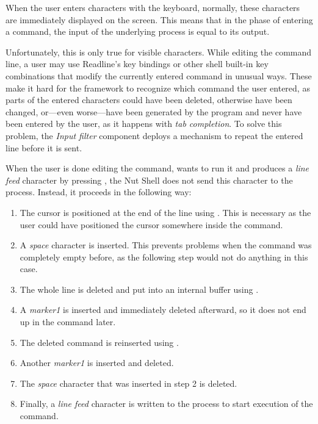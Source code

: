 \documentclass[paper=a4,abstract=on,cleardoublepage=empty,numbers=noenddot,toc=bib,12pt,appendixprefix=true]{scrreprt}
\begin{document}
When the user enters characters with the keyboard, normally, these characters are immediately displayed on the screen. This means that in the phase of entering a command, the input of the underlying process is equal to its output.

Unfortunately, this is only true for visible characters. While editing the command line, a user may use Readline's key bindings or other shell built-in key combinations that modify the currently entered command in unusual ways. These make it hard for the framework to recognize which command the user entered, as parts of the entered characters could have been deleted, otherwise have been changed, or---even worse---have been generated by the program and never have been entered by the user, as it happens with \emph{tab completion}. To solve this problem, the \emph{Input filter} component deploys a mechanism to repeat the entered line before it is sent.

When the user is done editing the command, wants to run it and produces a \emph{line feed} character by pressing , the Nut Shell does not send this character to the process. Instead, it proceeds in the following way:

\begin{enumerate}[itemsep=1mm]
    \item The cursor is positioned at the end of the line using . This is necessary as the user could have positioned the cursor somewhere inside the command.
    \item A \emph{space} character is inserted. This prevents problems when the command was completely empty before, as the following step would not do anything in this case.
    \item The whole line is deleted and put into an internal buffer using \mbox{}.
    \item A \emph{marker1} is inserted and immediately deleted afterward, so it does not end up in the command later.
    \item The deleted command is reinserted using .
    \item Another \emph{marker1} is inserted and deleted.
    \item The \emph{space} character that was inserted in step 2 is deleted.
    \item Finally, a \emph{line feed} character is written to the process to start execution of the command.
\end{enumerate}
\end{document}
